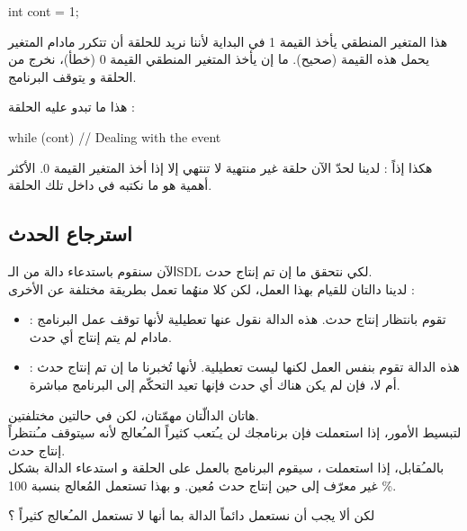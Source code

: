 \begin{Csource}
int cont = 1;
\end{Csource}

هذا المتغير المنطقي يأخذ القيمة 1 في البداية لأننا نريد للحلقة أن تتكرر مادام المتغير
يحمل هذه القيمة (صحيح). ما إن يأخذ المتغير المنطقي القيمة 0 (خطأ)، نخرج من الحلقة و يتوقف البرنامج.

هذا ما تبدو عليه الحلقة :

\begin{Csource}
while (cont)
{
	// Dealing with the event
}
\end{Csource}

هكذا إذاً : لدينا لحدّ الآن حلقة غير منتهية لا تنتهي إلا إذا أخذ المتغير 
القيمة 0. الأكثر أهمية هو ما نكتبه في داخل تلك الحلقة.

\subsection{استرجاع الحدث}

الآن سنقوم باستدعاء دالة من الـ\textenglish{SDL}
لكي نتحقق ما إن تم إنتاج حدث.\\
لدينا دالتان للقيام بهذا العمل، لكن كلا منهُما تعمل بطريقة مختلفة عن الأخرى :

\begin{itemize}
	\item {} :
	تقوم بانتظار إنتاج حدث. هذه الدالة نقول عنها تعطيلية لأنها توقف عمل البرنامج مادام لم يتم إنتاج أي حدث.
	\item {} :
	هذه الدالة تقوم بنفس العمل لكنها ليست تعطيلية. لأنها تُخبرنا ما إن تم إنتاج حدث أم لا، فإن لم يكن هناك أي حدث فإنها تعيد التحكّم إلى البرنامج مباشرة.
\end{itemize}

هاتان الدالّتان مهمّتان، لكن في حالتين مختلفتين.\\
لتبسيط الأمور، إذا استعملت 
فإن برنامجك لن يـُتعب كثيراً المـُعالج لأنه سيتوقف مـُنتظراً إنتاج حدث.\\
بالمـُقابل، إذا استعملت 
،
سيقوم البرنامج بالعمل على الحلقة
و استدعاء الدالة 
بشكل غير معرّف إلى حين إنتاج حدث مُعين. و بهذا تستعمل المُعالج  بنسبة 100
\%.

\begin{question}
لكن ألا يجب أن نستعمل دائماً الدالة 
بما أنها لا تستعمل المـُعالج كثيراً ؟
\end{question}

